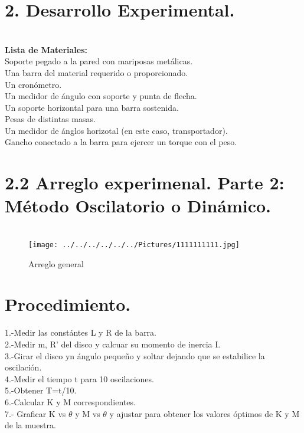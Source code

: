 \documentclass[10pt,a4paper]{article}
\begin{document}
\section*{2.  Desarrollo Experimental.}\\
\textbf{Lista de Materiales:} \\
Soporte pegado a la pared con mariposas met\'{a}licas.\\
Una barra del material requerido o proporcionado. \\
Un cron\'{o}metro. \\
Un medidor de \'{a}ngulo con soporte y punta de flecha. \\
Un soporte horizontal para una barra sostenida.\\
Pesas de distintas masas. \\
Un medidor de \'{a}nglos horizotal (en este caso, transportador).  \\
Gancho conectado a la barra para ejercer un torque con el peso. \\
\section*{2.2 Arreglo experimenal. Parte 2: M\'{e}todo Oscilatorio o Din\'{a}mico.}
\begin{figure}[hbtp]
\centering
\\
\texttt{[image: ../../../../../../Pictures/1111111111.jpg]}  
\caption{Arreglo general}
\end{figure} 


\section*{Procedimiento.}
1.-Medir las const\'{a}ntes L y R de la barra.\\
2.-Medir m, R' del disco y calcuar su momento de inercia I.\\
3.-Girar el disco yn \'{a}ngulo peque\~{n}o y soltar dejando que se estabilice la oscilaci\'{o}n. \\
4.-Medir el tiempo t para 10 oscilaciones.\\
5.-Obtener T=t/10.\\
6.-Calcular K y M correspondientes.\\
7.- Graficar K vs $\theta$ y M vs $\theta$ y ajustar para obtener los valores \'{o}ptimos de K y M de la muestra.
\end{document}
